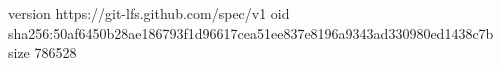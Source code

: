 version https://git-lfs.github.com/spec/v1
oid sha256:50af6450b28ae186793f1d96617cea51ee837e8196a9343ad330980ed1438c7b
size 786528
